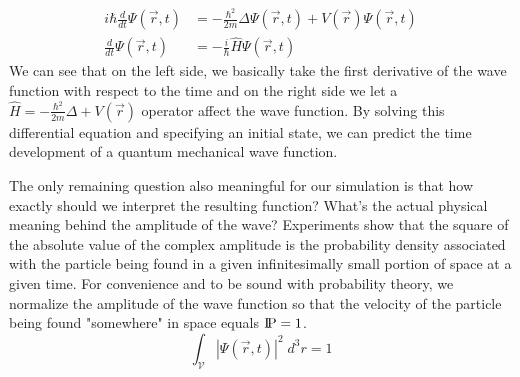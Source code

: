\begin{equation}
	\label{eq::schrodinger_general}
	\begin{split}
		i \hbar \frac{d}{dt}\Psi(\vec{r}, t) &= - \frac{\hbar^2}{2m}\Delta\Psi(\vec{r}, t) + V(\vec{r})\Psi(\vec{r}, t)\\
		\frac{d}{dt}\Psi(\vec{r}, t) &= -\frac{i}{\hbar}\hat{H}\Psi(\vec{r}, t)
	\end{split}
\end{equation}
We can see that on the left side, we basically take the first derivative of the wave function with respect to the time and on the right side we let a $\hat{H} = -\frac{\hbar^2}{2m}\Delta + V(\vec{r})$ operator affect the wave function.
By solving this differential equation and specifying an initial state, we can predict the time development of a quantum mechanical wave function.

The only remaining question also meaningful for our simulation is that how exactly should we interpret the resulting function?
What's the actual physical meaning behind the amplitude of the wave?
Experiments show that the square of the absolute value of the complex amplitude is the probability density associated with the particle being found in a given infinitesimally small portion of space at a given time.
For convenience and to be sound with probability theory, we normalize the amplitude of the wave function so that the velocity of the particle being found "somewhere" in space equals $\text{I\kern-0.15em P} = 1$.
\begin{equation}
	\label{eq:normalization}
	\int_\mathcal{V} |\Psi(\vec{r}, t)|^2 \;d^3r = 1
\end{equation}


